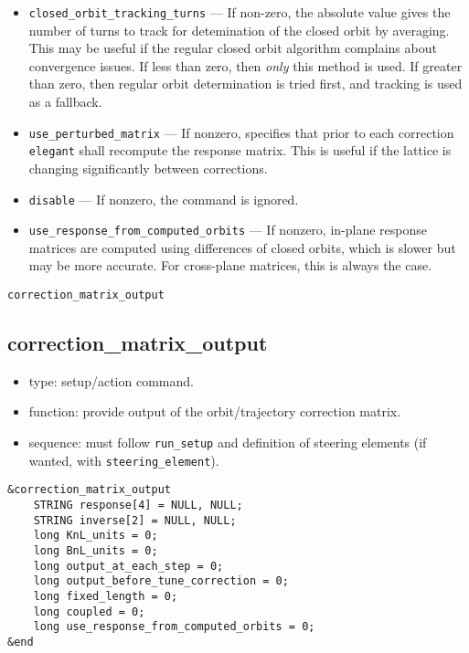 \documentclass[11pt]{article}
\begin{document}
\begin{itemize}
\item \verb|closed_orbit_tracking_turns| --- If non-zero, the absolute value gives the number of turns to track for detemination 
  of the closed orbit by averaging. This may be useful if the regular closed orbit algorithm
  complains about convergence issues. If less than zero, then {\em only} this method is used. If greater than zero, 
  then regular orbit determination is tried first, and tracking is used as a fallback.
\item \verb|use_perturbed_matrix| --- If nonzero, specifies that prior to each 
	correction \verb|elegant| shall recompute the response matrix.  This
	is useful if the lattice is changing significantly between corrections.
\item \verb|disable| --- If nonzero, the command is ignored.
\item \verb|use_response_from_computed_orbits| --- If nonzero, in-plane response matrices are computed
  using differences of closed orbits, which is slower but may be more accurate. For cross-plane matrices, this is always the case.
\end{itemize}

\newpage
\begin{center}{\Large\verb|correction_matrix_output|}\end{center}
\subsection{correction\_matrix\_output \label{subsec:correctionmatrixoutput}}

\begin{itemize}
\item type: setup/action command.
\item function: provide output of the orbit/trajectory correction matrix.
\item sequence: must follow \verb|run_setup| and definition of steering elements (if wanted, with \verb|steering_element|).
\end{itemize}

\begin{verbatim}
&correction_matrix_output
    STRING response[4] = NULL, NULL;
    STRING inverse[2] = NULL, NULL;
    long KnL_units = 0;
    long BnL_units = 0;
    long output_at_each_step = 0;
    long output_before_tune_correction = 0;
    long fixed_length = 0;
    long coupled = 0;
    long use_response_from_computed_orbits = 0;
&end
\end{verbatim}
\end{document}
